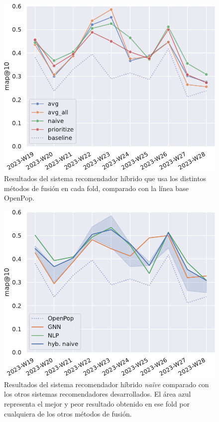 \begin{figure}[p]
    \centering
    \includegraphics[width=.7\linewidth]{figures/04_implementacion/12_hybrid_merge_results_folds_Decentraland_W-THU_normalize=True_simple.pdf}
    \caption[Resultados del sistema recomendador híbrido que usa los distintos métodos de fusión en cada fold]{Resultados del sistema recomendador híbrido que usa los distintos métodos de fusión en cada fold, comparado con la línea base OpenPop.}
    \label{fig:hybrid-fusion-results-folds}
\end{figure}
\begin{figure}[p]
    \centering
    \includegraphics[width=.7\linewidth]{figures/04_implementacion/12_hybrid_merge_results_folds_Decentraland_W-THU_normalize=True_compare.pdf}
    \caption[Comparación del mejor híbrido con otros sistemas recomendadores.]{Resultados del sistema recomendador híbrido \textit{naïve} comparado con los otros sistemas recomendadores desarrollados. El área azul representa el mejor y peor resultado obtenido en ese fold por cualquiera de los otros métodos de fusión.}
    \label{fig:hybrid-best-results-folds}
\end{figure}
